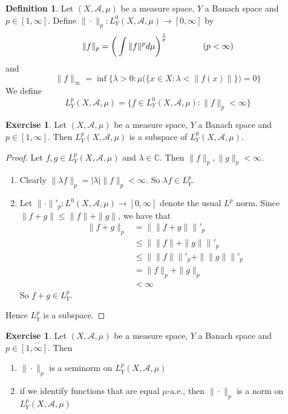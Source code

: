 \documentclass[12pt]{amsart}
\theoremstyle{definition}
\newtheorem{defn}[definition]{Definition}
\newtheorem{ex}[definition]{Exercise}
\newcommand{\lam}{\lambda}
\newcommand{\C}{\mathbb{C}}
\newcommand{\MA}{\mathcal{A}}
\newcommand{\RG}{[0,\infty]}
\newcommand{\lex}[1]{\label{ex:#1}}
\newcommand{\ld}[1]{\label{defn:#1}}
\begin{document}
	\begin{defn} \ld{00000} 
		Let $(X, \MA, \mu)$ be a measure space, $Y$ a Banach space and $p \in [1, \infty]$. Define $  \| \cdot \|_p : L_Y^0(X, \MA, \mu) \rightarrow [0, \infty]$ by $$\|f \|_p = \bigg(\int  \|f\|^p d\mu \bigg)^{\frac{1}{p}} \hspace{1.5cm}( p < \infty)$$ 
		and 
		$$\|f \|_{\infty} = \inf \bigg \{\lam >0: \mu\big(\{x \in X: \lam < \|f(x)\|  \}\big) = 0 \bigg \} $$
		We define $$L_Y^p(X, \MA, \mu) =  \{f \in L_Y^0(X, \MA, \mu): \|f \|_p < \infty \}$$
	\end{defn}	
	
	\begin{ex} \lex{00000} 
	Let $(X, \MA, \mu)$ be a measure space, $Y$ a Banach space and $p \in [1, \infty]$. Then $L_Y^p(X, \MA, \mu)$ is a subspace of $L_Y^0(X, \MA, \mu)$. 
	\end{ex}
	
	\begin{proof}Let $f, g \in L^p_Y(X, \MA, \mu)$ and $\lam \in \C$. Then $\|f\|_p, \|g\|_p < \infty$.
	\begin{enumerate}
	\item Clearly $\|\lam f\|_p = |\lam|\|f\|_p < \infty$.
	So $\lam f \in L^p_Y$.
	\item Let $\|\cdot \|'_p: L^0(X, \MA, \mu) \rightarrow \RG$ denote the usual $L^p$ norm. Since $\|f + g\| \leq \|f\| + \|g\|$, we have that 
	\begin{align*}
	\|f+g\|_p 
	&= \| \|f+g\| \|'_p \\
	& \leq \|\|f\| + \|g\| \|'_p \\
	& \leq  \|\|f\| \|'_p + \|\|g\| \|'_p \\
	&= \|f \|_p + \|g\|_p \\
	& < \infty
\end{align*}	
So $f+g \in L^p_Y$.
	\end{enumerate}
	Hence $L^p_Y$ is a subspace.
	\end{proof}
	
	\begin{ex} \lex{00000} 
	Let $(X, \MA, \mu)$ be a measure space, $Y$ a Banach space and $p \in [1, \infty]$. Then 
	\begin{enumerate}
	\item $\|\cdot\|_p$ is a seminorm on $L^p_Y(X, \MA, \mu)$
	\item if we identify functions that are equal $\mu$-a.e., then $\|\cdot\|_p$ is a norm on $L^p_Y(X, \MA, \mu)$
	\end{enumerate}
	\end{ex}
	
\end{document}
